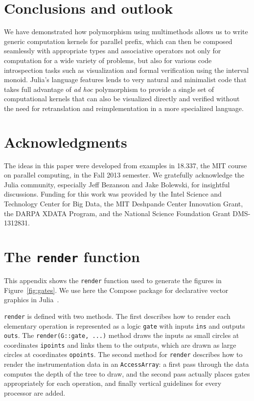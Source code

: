 \documentclass{sig-alternate}
\newcommand{\code}[1]{\texttt{#1}}
\begin{document}
\section{Conclusions and outlook}

We have demonstrated how polymorphism using multimethods allows us to write
generic computation kernels for parallel prefix, which can then be composed
seamlessly with appropriate types and associative operators not only for
computation for a wide variety of problems, but also for various code
introspection tasks such as visualization and formal verification using the
interval monoid. Julia's language features lends to very natural and minimalist
code that takes full advantage of \textit{ad hoc} polymorphism to provide a
single set of computational kernels that can also be visualized directly and
verified without the need for retranslation and reimplementation in a more
specialized language.

\section{Acknowledgments}

The ideas in this paper were developed from examples in 18.337, the MIT course
on parallel computing, in the Fall 2013 semester. We gratefully acknowledge the
Julia community, especially Jeff Bezanson and Jake Bolewski, for insightful
discussions. Funding for this work was provided by the Intel Science and
Technology Center for Big Data, the MIT Deshpande Center Innovation Grant, the
DARPA XDATA Program, and the National Science Foundation Grant DMS-1312831.




\appendix

\section{The \code{render} function}
\label{sec:render}

This appendix shows the \code{render} function used to generate the figures in
Figure~\ref{fig:gates}. We use here the Compose package for declarative vector
graphics in Julia~\cite{Compose.jl}.

\code{render} is defined with two methods. The first describes how to render
each elementary operation is represented as a logic \code{gate} with inputs
\code{ins} and outputs \code{outs}. The \code{render(\allowbreak{}G::gate, ...)} method
draws the inputs as small circles at coordinates \code{ipoints} and links them
to the outputs, which are drawn as large circles at coordinates \code{opoints}.
The second method for \code{render} describes how to render the instrumentation
data in an \code{AccessArray}: a first pass through the data computes the depth
of the tree to draw, and the second pass actually places gates appropriately
for each operation, and finally vertical guidelines for every processor are
added.
\end{document}
